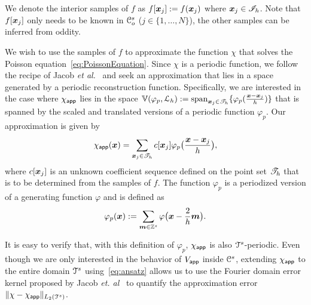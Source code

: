 We denote the interior samples of $f$ as $f[\vect{x}_j] :=
f(\vect{x}_j)$ where $\vect{x}_j \in \pointset{I}_h$. Note that
$f[\vect{x}_j]$ only needs to be known in $\oucube^s$ ($j \in
\{1,\ldots,N\}$), the other samples can be inferred from
oddity. 

We wish to use the samples of $f$ to approximate the function $\chi$ that solves the Poisson equation~\eqref{eq:PoissonEquation}. Since
$\chi$ is a periodic function, we follow the recipe of Jacob \textit{et al.}~\cite{jacob02} and seek an approximation that lies in a space generated by a periodic reconstruction function. Specifically, we are interested in the case
where $\appf{\chi}$ lies in the space $\aspace{\lattice{L}_h}{\varphi_p} := \mathrm{span}_{\vect{x}_j\in\pointset{T}_h}\{
\varphi_p(\frac{\vect{x}-\vect{x}_j}{h}) \}$ that is spanned by the scaled and translated versions of a periodic function $\varphi_p$. Our approximation is given by
\begin{equation}
  \appf{\chi}(\vect{x}) = \sum_{\vect{x}_j \in \pointset{T}_h} c[\vect{x}_j] 
\varphi_p\bigl(\frac{\vect{x} - \vect{x}_j}{h}\bigr),
\label{eq:ansatz}
\end{equation}
where $c[\vect{x}_j]$ is an unknown coefficient sequence defined on the point set $\pointset{T}_h$ that is to be determined from the samples of $f$. The function $\varphi_p$ is a periodized version of a generating function $\varphi$ and is defined as
\begin{equation}
\varphi_p(\vect{x}) := \sum_{\vect{m} \in \ints^s} 
\varphi\bigl(\vect{x} - \frac{2}{h} \vect{m} \bigr).
\label{eq:periodization}
\end{equation}


It is easy to verify that, with this definition of $\varphi_p$,
$\appf{\chi}$ is also $\cube^s$-periodic. Even though we are only
interested in the behavior of $\appf{V}$ inside $\ucube^s$, extending $\appf{\chi}$ to the entire domain $\cube^s$ using~\eqref{eq:ansatz} allows us to use the Fourier domain error kernel proposed by Jacob \textit{et. al}~\cite{jacob02} to quantify the approximation error $\LLnorm{\chi - \appf{\chi}}$.

